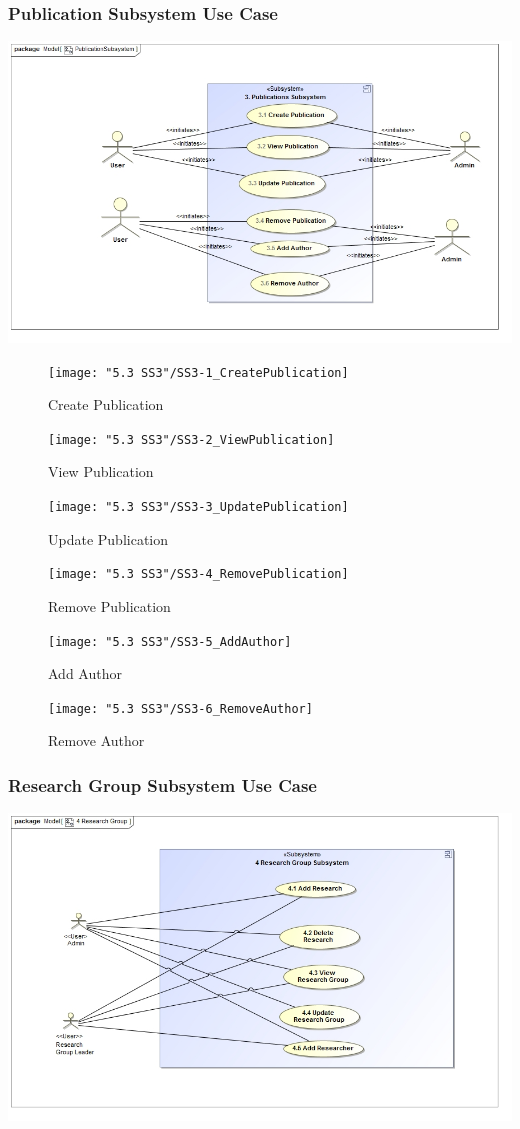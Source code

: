 \documentclass{article}
\begin{document}
			\subsubsection{Publication Subsystem Use Case}
				\includegraphics[width=\textwidth]{SS3_PublicationSubsystem}
				\begin{figure}
					\texttt{[image: "5.3 SS3"/SS3-1\_CreatePublication]}
					\caption{Create Publication}
				\end{figure}
				\begin{figure}
					\texttt{[image: "5.3 SS3"/SS3-2\_ViewPublication]}
					\caption{View Publication}
				\end{figure}
				\begin{figure}
					\texttt{[image: "5.3 SS3"/SS3-3\_UpdatePublication]}
					\caption{Update Publication}
				\end{figure}
				\begin{figure}
					\texttt{[image: "5.3 SS3"/SS3-4\_RemovePublication]}
					\caption{Remove Publication}
				\end{figure}
				\begin{figure}
					\texttt{[image: "5.3 SS3"/SS3-5\_AddAuthor]}
					\caption{Add Author}
				\end{figure}
				\begin{figure}
					\texttt{[image: "5.3 SS3"/SS3-6\_RemoveAuthor]}
					\caption{Remove Author}
				\end{figure}
			\subsubsection{Research Group Subsystem Use Case}
				\includegraphics[width=\textwidth]{ResearchGroup}
\end{document}
